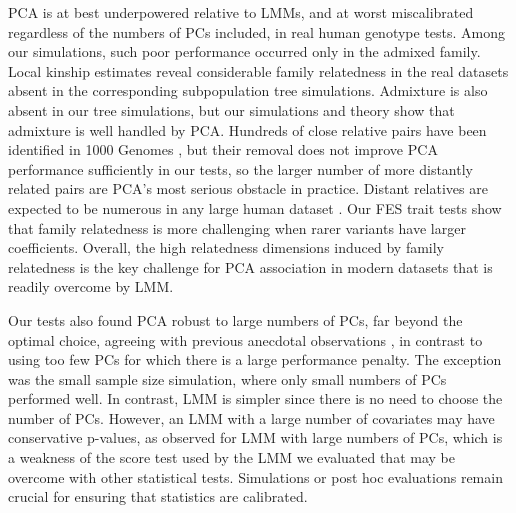 \documentclass[9pt,lineno]{elife}
\begin{document}
PCA is at best underpowered relative to LMMs, and at worst miscalibrated regardless of the numbers of PCs included, in real human genotype tests.
Among our simulations, such poor performance occurred only in the admixed family.
Local kinship estimates reveal considerable family relatedness in the real datasets absent in the corresponding subpopulation tree simulations.
Admixture is also absent in our tree simulations, but our simulations and theory show that admixture is well handled by PCA.
Hundreds of close relative pairs have been identified in 1000 Genomes \citep{gazal_high_2015, al-khudhair_inference_2015, fedorova_atlas_2016, schlauch_identification_2017}, but their removal does not improve PCA performance sufficiently in our tests, so the larger number of more distantly related pairs are PCA's most serious obstacle in practice.
Distant relatives are expected to be numerous in any large human dataset \citep{henn_cryptic_2012, shchur_number_2018, loh_mixed-model_2018}.
Our FES trait tests show that family relatedness is more challenging when rarer variants have larger coefficients.
Overall, the high relatedness dimensions induced by family relatedness is the key challenge for PCA association in modern datasets that is readily overcome by LMM.

Our tests also found PCA robust to large numbers of PCs, far beyond the optimal choice, agreeing with previous anecdotal observations \citep{price_principal_2006, kang_variance_2010}, in contrast to using too few PCs for which there is a large performance penalty.
The exception was the small sample size simulation, where only small numbers of PCs performed well.
In contrast, LMM is simpler since there is no need to choose the number of PCs.
However, an LMM with a large number of covariates may have conservative p-values, as observed for LMM with large numbers of PCs, which is a weakness of the score test used by the LMM we evaluated that may be overcome with other statistical tests.
Simulations or post hoc evaluations remain crucial for ensuring that statistics are calibrated.
\end{document}
